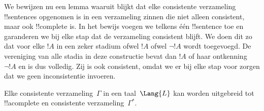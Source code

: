 \documentclass[openany]{memoir}
\begin{document}
\begingroup
\def\olfilename{OLP-0131}
\def\olfilepath{content/first-order-logic/completeness/}
\hypertarget{unit-OLP-0131}{}



      {}
      {}


\begin{explain}
We bewijzen nu een lemma waaruit blijkt dat elke consistente verzameling
!!{sentence}s opgenomen is in een verzameling zinnen die niet alleen
consistent, maar ook !!{complete} is. In het bewijs voegen we telkens één
!!{sentence} toe en garanderen we bij elke stap dat de verzameling
consistent blijft. We doen dit zo dat voor elke $!A$ in een zeker stadium
ofwel $!A$ ofwel $\lnot !A$ wordt toegevoegd. De vereniging van alle
stadia in deze constructie bevat dan $!A$ of haar ontkenning~$\lnot !A$
en is dus volledig. Zij is ook consistent, omdat we er bij elke stap voor
zorgen dat we geen inconsistentie invoeren.
\end{explain}

\begin{lem}
 Elke consistente verzameling~$\Gamma$ in een
taal~$\Lang{L}$ kan worden uitgebreid tot !!a{complete} en consistente
verzameling~$\Gamma^*$.
\end{lem}
\end{document}
